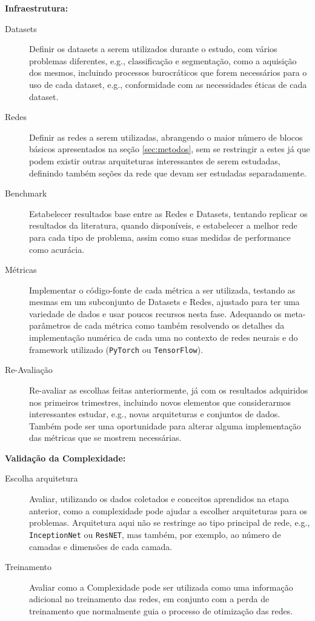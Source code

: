 \documentclass[
	12pt,				%
	openany,oneside,
	a4paper,			%
	english,			%
	brazil,				%
	]{abntex2}
\begin{document}
\textbf{Infraestrutura:}
\begin{description}
\item[Datasets] Definir os datasets a serem utilizados durante o estudo, com vários problemas diferentes, e.g., classificação e segmentação, como a aquisição dos mesmos, incluindo processos burocráticos que forem necessários para o uso de cada dataset, e.g., conformidade com as necessidades éticas de cada dataset.
\item[Redes] Definir as redes a serem utilizadas, abrangendo o maior número de blocos básicos apresentados na seção \ref{sec:metodos}, sem se restringir a estes já que podem existir outras arquiteturas interessantes de serem estudadas, definindo também seções da rede que devam ser estudadas separadamente.
\item[Benchmark] Estabelecer resultados base entre as Redes e Datasets, tentando replicar os resultados da literatura, quando disponíveis, e estabelecer a melhor rede para cada tipo de problema, assim como suas medidas de performance como acurácia.
\item[Métricas] Implementar o código-fonte de cada métrica a ser utilizada, testando as mesmas em um subconjunto de Datasets e Redes, ajustado para ter uma variedade de dados e usar poucos recursos nesta fase. Adequando os meta-parâmetros de cada métrica como também resolvendo os detalhes da implementação numérica de cada uma no contexto de redes neurais e do framework utilizado (\texttt{PyTorch} ou \texttt{TensorFlow}).
\item[Re-Avaliação] Re-avaliar as escolhas feitas anteriormente, já com os resultados adquiridos nos primeiros trimestres, incluindo novos elementos que considerarmos interessantes estudar, e.g., novas arquiteturas e conjuntos de dados. Também pode ser uma oportunidade para alterar alguma implementação das métricas que se mostrem necessárias. 
\end{description}

\textbf{Validação da Complexidade:}
\begin{description}
\item[Escolha arquitetura] Avaliar, utilizando os dados coletados e conceitos aprendidos na etapa anterior, como a complexidade pode ajudar a escolher arquiteturas para os problemas. Arquitetura aqui não se restringe ao tipo principal de rede, e.g., \texttt{InceptionNet} ou \texttt{ResNET}, mas também, por exemplo, ao número de camadas e dimensões de cada camada.
\item[Treinamento] Avaliar como a Complexidade pode ser utilizada como uma informação adicional no treinamento das redes, em conjunto com a perda de treinamento que normalmente guia o processo de otimização das redes.
\end{description}
\end{document}
